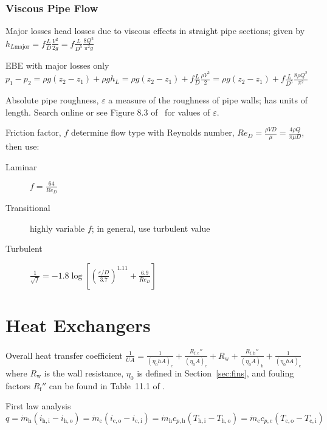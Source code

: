 \documentclass{article}
\begin{document}
\subsubsection{Viscous Pipe Flow}
\begin{description*}
\item[Major losses] head losses due to viscous effects in straight pipe sections; given by
  \(h_{L\mathrm{major}} = f\frac{L}{D}\frac{V^2}{2g} = f\frac{L}{D^5}\frac{8Q^2}{\pi^2g}\)
\item[EBE with major losses only]
  \(p_1-p_2 = \rho{}g(z_2-z_1)+\rho{}gh_L = \rho{}g(z_2-z_1) + f\frac{L}{D}\frac{\rho{}V^2}{2}
  = \rho{}g(z_2-z_1) + f\frac{L}{D^5}\frac{8\rho{}Q^2}{\pi^2}\)
\item[Absolute pipe roughness, $\varepsilon$] a measure of the roughness of pipe walls; has units of
  length. Search online or see Figure 8.3 of~\cite{hamt} for values of $\varepsilon$.
\item[Friction factor, $f$] determine flow type with Reynolds number,
  \(\mathit{Re}_D = \frac{\rho{}VD}{\mu} = \frac{4\rho{}Q}{\pi\mu{}D}\), then use:
  \begin{description}
  \item[Laminar]
    \(f = \frac{64}{\mathit{Re}_D}\)
  \item[Transitional]
    highly variable $f$; in general, use turbulent value
  \item[Turbulent]
    \(\frac{1}{\sqrt{f}}
    = -1.8\log\left[\left(\frac{\varepsilon/D}{3.7}\right)^{1.11}
      + \frac{6.9}{\mathit{Re}_D}\right]\)
  \end{description}
\end{description*}

\section{Heat Exchangers}
\label{sec:heat-exchangers}

\begin{description*}
\item[Overall heat transfer coefficient]
  \(\frac{1}{UA} = \frac{1}{(\eta_0hA)_\mathrm{c}} + \frac{R_\mathrm{f,c}''}{(\eta_0A)_\mathrm{c}}
  + R_\mathrm{w} + \frac{R_\mathrm{f,h}''}{(\eta_0A)_\mathrm{h}} + \frac{1}{(\eta_0hA)_\mathrm{c}}\)
  where $R_\mathrm{w}$ is the wall resistance, $\eta_0$ is defined in Section~\ref{sec:fins}, and
  fouling factors $R_\mathrm{f}''$ can be found in Table~11.1 of \cite{hamt}.
\item[First law analysis]
  \(q = \dot{m}_\mathrm{h}(i_\mathrm{h,i} - i_\mathrm{h,o})
  = \dot{m}_\mathrm{c}(i_\mathrm{c,o} - i_\mathrm{c,i})
  = \dot{m}_\mathrm{h}c_{p,\mathrm{h}}(T_\mathrm{h,i} - T_\mathrm{h,o})
  = \dot{m}_\mathrm{c}c_{p,\mathrm{c}}(T_\mathrm{c,o} - T_\mathrm{c,i})\)
\end{description*}
\end{document}
